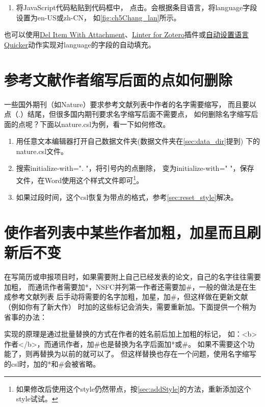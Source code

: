 \documentclass[theorem=false,mathfont=none,openany,sub3section]{easybook}
\begin{document}
{\begin{enumerate}
\begin{enumerate}[(1)]
		\item 将JavaScript代码粘贴到代码框中，
		点击。会根据条目语言，将language字段设置为en-US或zh-CN，
		如\autoref{fig:ch5Chang_lan}所示。
	\end{enumerate}
\end{enumerate}
也可以使用\href{https://github.com/redleafnew/delitemwithatt}{Del Item With Attachment}、\href{https://github.com/northword/zotero-format-metadata}{Linter for Zotero}插件或\href{https://getquicker.net/Sharedaction?code=e16164f9-2759-4054-d88b-08db94dc6a8e}{自动设置语言}\href{https://getquicker.net/}{Quicker}动作实现对language的字段的自动填充。

\section{参考文献作者缩写后面的点如何删除}\label{sec:authorPoint}
一些国外期刊（如Nature）要求参考文献列表中作者的名字需要缩写，
而且要以点（.）结尾，但很多国内期刊要求名字缩写后面不需要点，
如何删除名字缩写后面的点呢？下面以nature.csl为例，看一下如何修改。
\begin{enumerate}
	\item 用任意文本编辑器打开自己数据文件夹(数据文件夹在\cref{sec:data_dir}提到)
	下的nature.csl文件。
	\item 搜索initialize-with=". "，将引号内的点删除，
	变为initialize-with=" "，保存文件，在Word使用这个样式文件即可\footnote{如果修改后使用这个style仍然带点，按\cref{sec:addStyle}的方法，重新添加这个style试试。}。
	\item 如果过段时间，这个csl恢复为带点的格式，参考\cref{sec:reset_style}解决。
\end{enumerate}

\section{使作者列表中某些作者加粗，加星而且刷新后不变}\label{sec:authorBold}

在写简历或申报项目时，如果需要附上自己已经发表的论文，自己的名字往往需要加粗，
而通讯作者需要加*，NSFC并列第一作者还需要加\#，一般的做法是在生成参考文献列表
后手动将需要的名字加粗，加星，加\#，但这样做在更新文献（例如你有了新大作）
时加的这些标记会消失，需要重新加。下面提供一个稍为省事的办法：

实现的原理是通过批量替换的方式在作者的姓名前后加上加粗的标记，
如：<b>作者</b>，而通讯作者，加\#也是替换为名字后面加*或\#。
如果不需要这个功能了，则再替换为以前的就可以了。
但这样替换也存在一个问题，使用名字缩写的csl时，加的*和\#会被省略。

}
\end{document}
